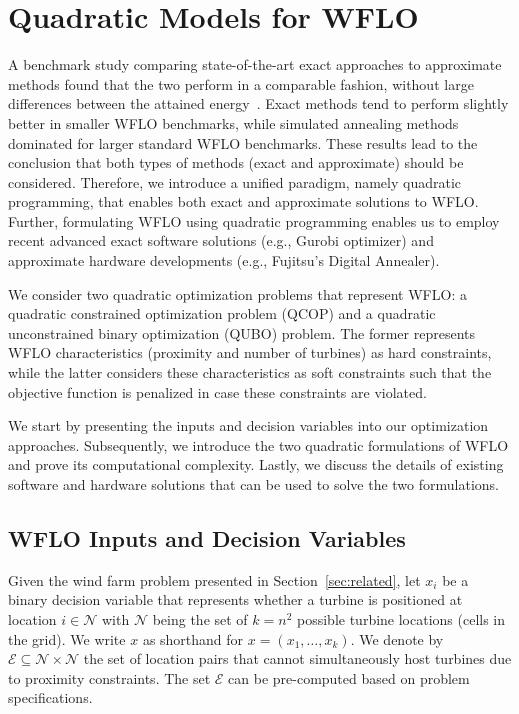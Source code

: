 \documentclass[preprint,12pt]{elsarticle}
\begin{document}
\section{Quadratic Models for WFLO}
\label{sec:QUBO4WFLO}

A benchmark study comparing state-of-the-art exact approaches \cite{Zhang2014} to 
approximate methods found that the two perform in a comparable fashion, without large differences between
the attained energy~\cite{yang2019simulated}. Exact methods tend to perform slightly better
in smaller WFLO benchmarks, while simulated annealing methods dominated for larger standard WFLO benchmarks. 
These results lead to the conclusion that both types of methods (exact and approximate) should be considered. Therefore, we introduce a unified paradigm, namely quadratic programming, that enables
both exact and approximate solutions to WFLO. Further, formulating WFLO using quadratic programming enables us to employ 
recent advanced exact software solutions (e.g., Gurobi optimizer) and approximate hardware developments 
(e.g., Fujitsu's Digital Annealer).



We consider two
quadratic optimization problems that represent WFLO: a
quadratic constrained optimization problem (QCOP) and 
a quadratic unconstrained binary optimization (QUBO) problem. 
The former represents WFLO characteristics (proximity and number of turbines)
as hard constraints, while the latter considers these characteristics as soft constraints such that the objective function is penalized in case these
constraints are violated.

We start by presenting the inputs and decision variables into our optimization approaches.
Subsequently, we introduce the two quadratic formulations of WFLO and 
prove its computational complexity. Lastly, we discuss the details of existing
software and hardware solutions that can be used to solve the two formulations. 

\subsection{WFLO Inputs and Decision Variables}
Given the wind farm problem presented in Section~\ref{sec:related},
let $x_i$ be a binary decision variable that represents whether a 
turbine is positioned at location 
$i \in \mathcal{N}$ with $\mathcal{N}$ being the set 
of $k = n^2$ possible turbine locations (cells in the grid). We 
write $x$ as shorthand for $x = (x_1,\ldots, x_k)$. 
We denote by $\mathcal{E} \subseteq \mathcal{N}\times \mathcal{N}$
the set of location pairs that cannot simultaneously host turbines 
due to proximity constraints. The set $\mathcal{E}$ can be pre-computed 
based on problem specifications.
\end{document}
